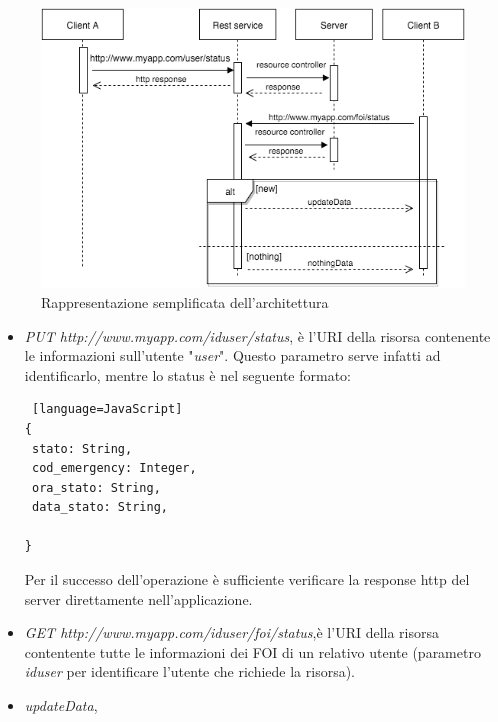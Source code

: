  \begin{figure}[H]
	\centering
	\includegraphics[scale=0.8]{Implementazione/updateStatus.png}
	\caption{Rappresentazione semplificata dell'architettura }
	\label{fig:rest}
\end{figure}
\begin{itemize}
\item \textit{PUT http://www.myapp.com/iduser/status}, è l'URI della risorsa contenente le informazioni sull'utente "\textit{user}". Questo parametro serve infatti ad identificarlo, mentre lo status è nel seguente formato:\\
\begin{lstlisting} [language=JavaScript]
{
 stato: String,
 cod_emergency: Integer,
 ora_stato: String,
 data_stato: String,
  
}
\end{lstlisting}
Per il successo dell'operazione è sufficiente verificare la response http del server direttamente nell'applicazione.
\item \textit{GET http://www.myapp.com/iduser/foi/status},è l'URI della risorsa contentente tutte le informazioni dei FOI di un relativo utente (parametro \textit{iduser} per identificare l'utente che richiede la risorsa).
\item \textit{updateData}, 
\end{itemize}